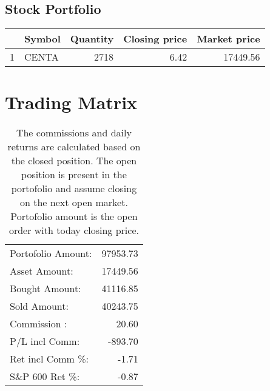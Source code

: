 \documentclass{tufte-handout}\usepackage[]{graphicx}\usepackage[]{color}
\begin{document}
\subsection{Stock Portfolio}
\begin{table}[ht]
\centering
\begin{tabular}{llrrr}
  \hline
 & Symbol & Quantity & Closing price & Market price \\ 
  \hline
1 & CENTA & 2718 & 6.42 & 17449.56 \\ 
   \hline
\end{tabular}
\end{table}



\section{Trading Matrix}

\begin{table}[ht]
\begin{tabular}{lr}
   \hline
Portofolio Amount: & 97953.73 \\ 
  Asset Amount: & 17449.56 \\ 
  Bought Amount: & 41116.85 \\ 
  Sold   Amount: & 40243.75 \\ 
  Commission   : & 20.60 \\ 
  P/L incl Comm: & -893.70 \\ 
  Ret incl Comm \%: & -1.71 \\ 
  S\&P 600 Ret \%: & -0.87 \\ 
   \hline
\end{tabular}
\caption{The commissions and daily returns are calculated based on the closed position.
The open position is present in the portofolio and assume closing on the next open market.
Portofolio amount is the open order with today closing price.} 
\end{table}



% 
% 
\end{document}
